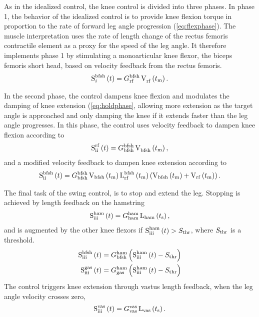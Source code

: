 As in the idealized control, the knee control is divided into three phases. In
phase 1, the behavior of the idealized control is to provide knee flexion torque
in proportion to the rate of forward leg angle progression
(\cref{eq:flexphase}). The muscle interpretation uses the rate of length change
of the rectus femoris contractile element as a proxy for the speed of the leg
angle. It therefore implements phase 1 by stimulating a monoarticular knee
flexor, the biceps femoris short head, based on velocity feedback from the
rectus femoris.
\begin{align}
    \func{S}[i][\tn{bfsh}]{t} = G_\tn{rf}^\tn{bfsh}\func{V}[\tn{rf}][]{t_\tn{m}}.
\end{align}

In the second phase, the control dampens knee flexion and modulates the damping
of knee extension (\cref{eq:holdphase}, allowing more extension as the target
angle is approached and only damping the knee if it extends faster than the leg
angle progresses. In this phase, the control uses velocity feedback to dampen
knee flexion according to
\begin{align}
    \func{S}[\tn{ii}][\tn{rf}]{t} = G_\tn{bfsh}^\tn{bfsh}
        \func{V}[\tn{bfsh}][]{t_\tn{m}},
\end{align}
and a modified velocity feedback to dampen knee extension according to
\begin{align}
    \func{S}[\tn{ii}][\tn{bfsh}]{t} = G_\tn{bfsh}^\tn{bfsh}
        \func{V}[\tn{bfsh}]{t_\tn{m}} \func{L}[\tn{rf}][\tn{bfsh}]{t_\tn{m}} 
        \left( \func{V}[\tn{bfsh}]{t_\tn{m}} + \func{V}[\tn{rf}]{t_\tn{m}}
        \right).
\end{align}

The final task of the swing control, is to stop and extend the leg. Stopping is
achieved by length feedback on the hamstring
\begin{align}
    \func{S}[\tn{iii}][\tn{ham}]{t} = G_\tn{ham}^\tn{ham}
        \func{L}[\tn{ham}]{t_\tn{s}},
\end{align}
and is augmented by the other knee flexors if $\func{S}[\tn{iii}][\tn{ham}]{t} >
S_\tn{thr}$, where $S_{\mathrm{thr}}$ is a threshold.
\begin{align}
    \func{S}[\tn{iii}][\tn{bfsh}]{t} &= G_\tn{bfsh}^\tn{ham}
        \left (\func{S}[\tn{iii}][\tn{ham}]{t} - S_\tn{thr} \right) \\
    \func{S}[\tn{iii}][\tn{gas}]{t} &= G_\tn{gas}^\tn{ham}
        \left (\func{S}[\tn{iii}][\tn{ham}]{t} - S_\tn{thr} \right)
\end{align}
The control triggers knee extension through vastus length feedback, when the leg angle velocity crosses zero,
\begin{align}
    \func{S}[\tn{iii}][\tn{vas}]{t} = G_\tn{vas}^\tn{vas}
        \func{L}[\tn{vas}]{t_\tn{s}}.
\end{align}

